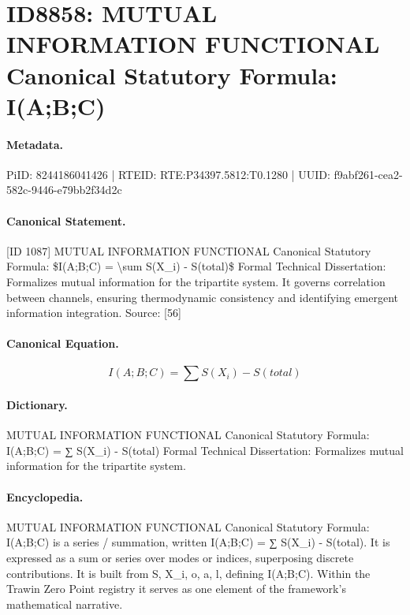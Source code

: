 \section*{ID8858: MUTUAL INFORMATION FUNCTIONAL Canonical Statutory Formula: I(A;B;C)}
\paragraph{Metadata.}
PiID: 8244186041426 | RTEID: RTE:P34397.5812:T0.1280 | UUID: f9abf261-cea2-582c-9446-e79bb2f34d2c

\paragraph{Canonical Statement.}
[ID 1087] MUTUAL INFORMATION FUNCTIONAL Canonical Statutory Formula: \$I(A;B;C) = \textbackslash{}sum S(X\_i) - S(total)\$ Formal Technical Dissertation: Formalizes mutual information for the tripartite system. It governs correlation between channels, ensuring thermodynamic consistency and identifying emergent information integration. Source: [56]

\paragraph{Canonical Equation.}
\[
I(A;B;C) = \sum S(X_i) - S(total)
\]

\paragraph{Dictionary.}
MUTUAL INFORMATION FUNCTIONAL Canonical Statutory Formula: I(A;B;C) = ∑ S(X\_i) - S(total) Formal Technical Dissertation: Formalizes mutual information for the tripartite system.

\paragraph{Encyclopedia.}
MUTUAL INFORMATION FUNCTIONAL Canonical Statutory Formula: I(A;B;C) is a series / summation, written I(A;B;C) = ∑ S(X\_i) - S(total). It is expressed as a sum or series over modes or indices, superposing discrete contributions. It is built from S, X\_i, o, a, l, defining I(A;B;C). Within the Trawin Zero Point registry it serves as one element of the framework's mathematical narrative.
